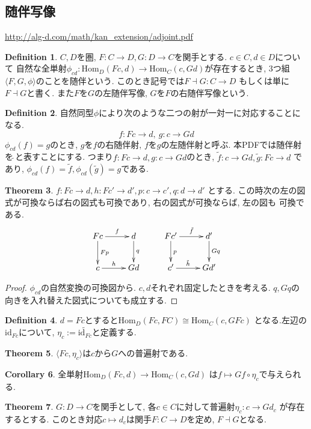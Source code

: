 \documentclass[a4paper,10pt]{article}
\theoremstyle{definition}
\newtheorem{thm}{\bfseries Theorem}[section]
\newtheorem{definition}[thm]{\bfseries Definition}
\newtheorem{cor}[thm]{\bfseries Corollary}
\begin{document}
\subsection{随伴写像}
\url{http://alg-d.com/math/kan_extension/adjoint.pdf}
\begin{definition}
    $C, D$を圏, $F: C \rightarrow D, G: D \rightarrow C$を関手とする. $c \in C, d \in D$について
    自然な全単射$\phi_{cd}: \mathrm{Hom}_D(Fc, d) \rightarrow \mathrm{Hom}_C(c,Gd)$が存在するとき,
    3つ組$\langle F,G,\phi \rangle$のことを随伴という. このとき記号では$F \dashv G: C \rightarrow D$
    もしくは単に$F \dashv G$と書く. また$F$を$G$の左随伴写像, $G$を$F$の右随伴写像という.
\end{definition}
\begin{definition}
    自然同型$\phi$により次のような二つの射が一対一に対応することになる.
    \[ f:Fc \rightarrow d, \ g:c \rightarrow Gd \]
    $\phi_{cd}(f) = g$のとき, $g$を$f$の右随伴射, $f$を$g$の左随伴射と呼ぶ.
    本PDFでは随伴射を$\tilde{\ }$と表すことにする. つまり$f:Fc \rightarrow d, g:
    c \rightarrow Gd$のとき, $\tilde{f}: c \rightarrow Gd, \tilde{g}: Fc \rightarrow d$
    であり, $\phi_{cd}(f) = \tilde{f}, \phi_{cd}(\tilde{g}) = g$である.
\end{definition}
\begin{thm}
    $f:Fc \rightarrow d, h:Fc' \rightarrow d', p: c \rightarrow c', q: d \rightarrow d'$
    とする. この時次の左の図式が可換ならば右の図式も可換であり, 右の図式が可換ならば, 左の図も
    可換である.
\begin{align*}
\xymatrix{
Fc \ar[r]^-{f} \ar[d]^-{Fp} & d \ar[d]^-{q}& 
Fc'\ar[r]^-{\tilde{f}} \ar[d]^{p} & d' \ar[d]^-{Gq} \\
c \ar[r]^-{h}& Gd
& c'\ar[r]^-{\tilde{h}}& Gd'
}
\end{align*}
\end{thm}
\begin{proof}
    $\phi_{cd}$の自然変換の可換図から. $c,d$それぞれ固定したときを考える.
    $q, Gq$の向きを入れ替えた図式についても成立する.
\end{proof}
\begin{definition}
    $d=Fc$とすると$\textrm{Hom}_D(Fc, FC) \cong \textrm{Hom}_C(c, GFc)$
    となる.左辺の$\textrm{id}_{Fc}$について, $\eta_{c}:= \widetilde{\textrm{id}_{Fc}}$と定義する.
\end{definition}
\begin{thm}
    $\langle Fc, \eta_{c} \rangle$は$c$から$G$への普遍射である.
\end{thm}

\begin{cor}
    全単射$\textrm{Hom}_D(Fc, d) \rightarrow \textrm{Hom}_C(c, Gd)$
    は$f \mapsto Gf \circ \eta_c$で与えられる.
\end{cor}
\begin{thm}
    $G: D \rightarrow C$を関手として, 各$c \in C$に対して普遍射$\eta_c:c \rightarrow Gd_c$
    が存在するとする. このとき対応$c \mapsto d_c$は関手$F: C \rightarrow D$を定め, $F \dashv G$となる.
\end{thm}
\end{document}
